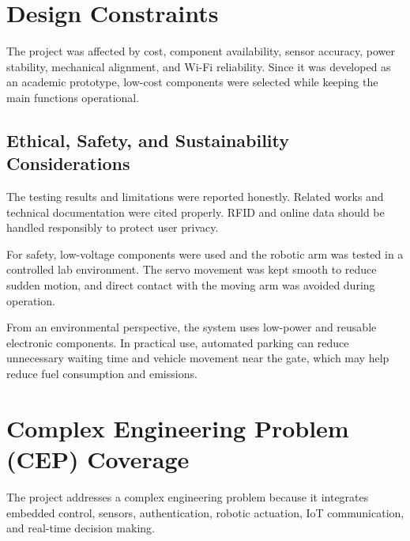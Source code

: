 \section{Design Constraints}

The project was affected by cost, component availability, sensor accuracy, power stability, mechanical alignment, and Wi-Fi reliability. Since it was developed as an academic prototype, low-cost components were selected while keeping the main functions operational.

\subsection{Ethical, Safety, and Sustainability Considerations}

The testing results and limitations were reported honestly. Related works and technical documentation were cited properly. RFID and online data should be handled responsibly to protect user privacy.

For safety, low-voltage components were used and the robotic arm was tested in a controlled lab environment. The servo movement was kept smooth to reduce sudden motion, and direct contact with the moving arm was avoided during operation.

From an environmental perspective, the system uses low-power and reusable electronic components. In practical use, automated parking can reduce unnecessary waiting time and vehicle movement near the gate, which may help reduce fuel consumption and emissions.

\section{Complex Engineering Problem (CEP) Coverage}

The project addresses a complex engineering problem because it integrates embedded control, sensors, authentication, robotic actuation, IoT communication, and real-time decision making.

